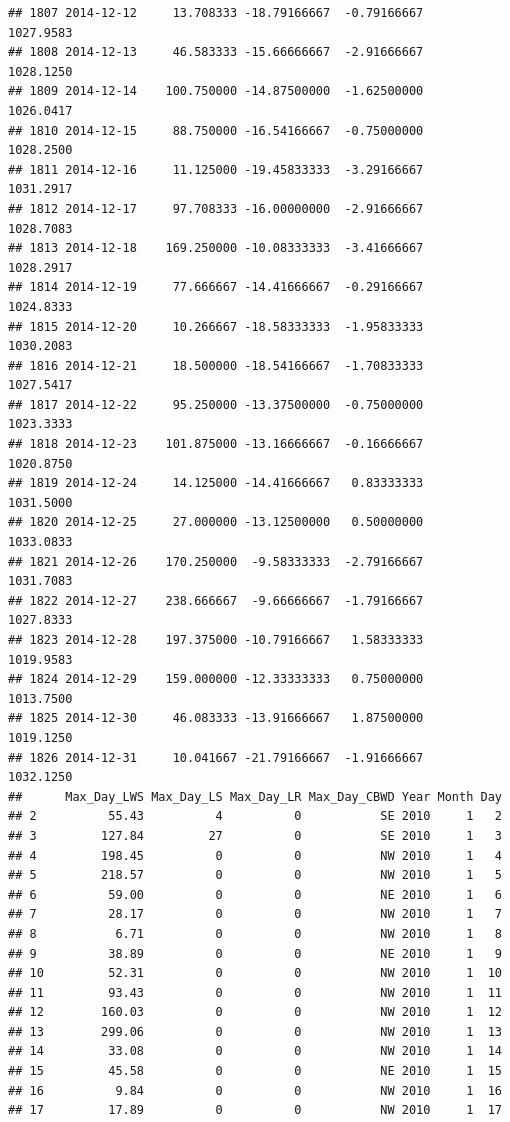 \documentclass[
]{article}
\begin{document}
\begin{verbatim}
## 1807 2014-12-12     13.708333 -18.79166667  -0.79166667    1027.9583
## 1808 2014-12-13     46.583333 -15.66666667  -2.91666667    1028.1250
## 1809 2014-12-14    100.750000 -14.87500000  -1.62500000    1026.0417
## 1810 2014-12-15     88.750000 -16.54166667  -0.75000000    1028.2500
## 1811 2014-12-16     11.125000 -19.45833333  -3.29166667    1031.2917
## 1812 2014-12-17     97.708333 -16.00000000  -2.91666667    1028.7083
## 1813 2014-12-18    169.250000 -10.08333333  -3.41666667    1028.2917
## 1814 2014-12-19     77.666667 -14.41666667  -0.29166667    1024.8333
## 1815 2014-12-20     10.266667 -18.58333333  -1.95833333    1030.2083
## 1816 2014-12-21     18.500000 -18.54166667  -1.70833333    1027.5417
## 1817 2014-12-22     95.250000 -13.37500000  -0.75000000    1023.3333
## 1818 2014-12-23    101.875000 -13.16666667  -0.16666667    1020.8750
## 1819 2014-12-24     14.125000 -14.41666667   0.83333333    1031.5000
## 1820 2014-12-25     27.000000 -13.12500000   0.50000000    1033.0833
## 1821 2014-12-26    170.250000  -9.58333333  -2.79166667    1031.7083
## 1822 2014-12-27    238.666667  -9.66666667  -1.79166667    1027.8333
## 1823 2014-12-28    197.375000 -10.79166667   1.58333333    1019.9583
## 1824 2014-12-29    159.000000 -12.33333333   0.75000000    1013.7500
## 1825 2014-12-30     46.083333 -13.91666667   1.87500000    1019.1250
## 1826 2014-12-31     10.041667 -21.79166667  -1.91666667    1032.1250
##      Max_Day_LWS Max_Day_LS Max_Day_LR Max_Day_CBWD Year Month Day
## 2          55.43          4          0           SE 2010     1   2
## 3         127.84         27          0           SE 2010     1   3
## 4         198.45          0          0           NW 2010     1   4
## 5         218.57          0          0           NW 2010     1   5
## 6          59.00          0          0           NE 2010     1   6
## 7          28.17          0          0           NW 2010     1   7
## 8           6.71          0          0           NW 2010     1   8
## 9          38.89          0          0           NE 2010     1   9
## 10         52.31          0          0           NW 2010     1  10
## 11         93.43          0          0           NW 2010     1  11
## 12        160.03          0          0           NW 2010     1  12
## 13        299.06          0          0           NW 2010     1  13
## 14         33.08          0          0           NW 2010     1  14
## 15         45.58          0          0           NE 2010     1  15
## 16          9.84          0          0           NW 2010     1  16
## 17         17.89          0          0           NW 2010     1  17

\end{verbatim}
\end{document}
